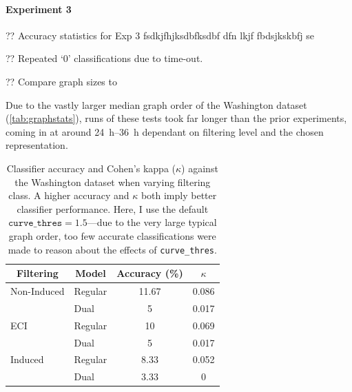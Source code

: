 \documentclass{mpaper}
\begin{document}
\paragraph{Experiment 3}
?? Accuracy statistics for Exp 3 fsdkjfhjksdbfksdbf dfn lkjf fbdsjkskbfj se 

?? Repeated `0' classifications due to time-out.

?? Compare graph sizes to \citeauthor{Graphs-Handwriting}

Due to the vastly larger median graph order of the Washington dataset (\cref{tab:graphstats}), runs of these tests took far longer than the prior experiments, coming in at around \SIrange{24}{36}{\hour} dependant on filtering level and the chosen representation.

\begin{table}
	\centering

	\begin{tabular}{llcc}
		\toprule
		\multicolumn{1}{c}{Filtering} & \multicolumn{1}{c}{Model} & Accuracy (\si{\percent}) & $\kappa$ \\
		\midrule
		
		Non-Induced & Regular & 11.67 & 0.086 \\
		& Dual & 5 & 0.017 \\
		
		ECI & Regular & 10 & 0.069 \\
		& Dual & 5 & 0.017 \\
		
		Induced & Regular & 8.33 & 0.052 \\
		& Dual & 3.33 & 0 \\
		
		\bottomrule
	\end{tabular}
	
	\vspace{0.5em}
	\caption{
		Classifier accuracy and Cohen's kappa ($\kappa$) against the Washington dataset when varying filtering class.
		A higher accuracy and $\kappa$ both imply better classifier performance.
		Here, I use the default $\mathtt{curve\_thres}=1.5$---due to the very large typical graph order, too few accurate classifications were made to reason about the effects of \texttt{curve\_thres}.
		\label{tab:exp3}
	}
\end{table}

%
%
%
\end{document}
